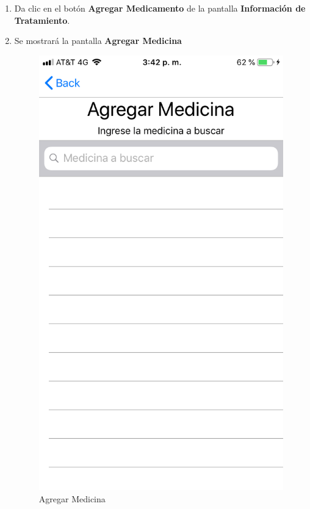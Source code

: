 \begin{enumerate}
	\item Da clic en el botón \textbf{Agregar Medicamento} de la pantalla \textbf{Información de Tratamiento}.
	
	\item Se mostrará la pantalla \textbf{Agregar Medicina}
	\newpage
	\begin{figure}[!htbp]			
		\hypertarget{fig:AgregarMedicina}{\hspace{1pt}}
		\begin{center}
			\includegraphics[height=0.4\textheight]{Paciente/AgregarMedicamento/images/AgregarMedicina}
			\caption{Agregar Medicina}
			\label{fig:AgregarMedicina}
		\end{center}
	\end{figure}


\end{enumerate}
